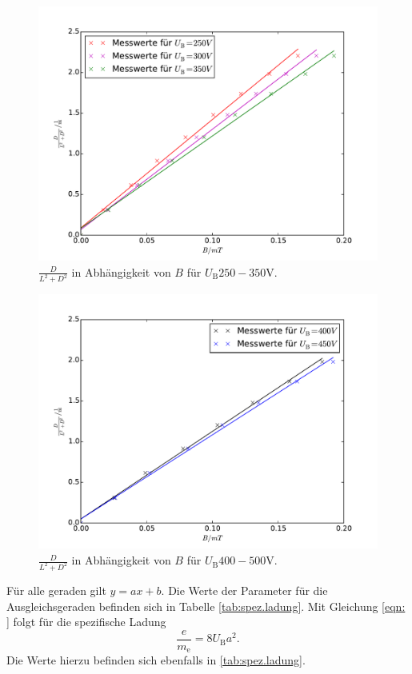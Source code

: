 \begin{figure}
  \centering
  \includegraphics[scale=0.8]{auswertung/502-a.pdf}
\caption{$\frac{D}{L^2+D^2}$ in Abhängigkeit von $B$ für $U_\mathrm{B} 250 - 350 \si{\volt}$.}
  \label{fig:spez.ladung1}
\end{figure}

\begin{figure}
  \centering
  \includegraphics[scale=0.8]{auswertung/502-a2.pdf}
\caption{$\frac{D}{L^2+D^2}$ in Abhängigkeit von $B$ für $U_\mathrm{B} 400 - 500 \si{\volt}$.}
  \label{fig:spez.ladung2}
\end{figure}

Für alle geraden gilt $y=ax+b$. Die Werte der Parameter für die Ausgleichsgeraden befinden sich in Tabelle \ref{tab:spez.ladung}.
Mit Gleichung \ref{eqn: } folgt für die spezifische Ladung
\begin{equation}
  \frac{e}{m_\mathrm{e}}=8U_\mathrm{B}a^2.
\end{equation}
Die Werte hierzu befinden sich ebenfalls in \ref{tab:spez.ladung}.


